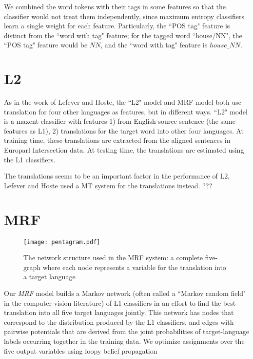 \documentclass[11pt,letterpaper]{article}
\begin{document}
We combined the word tokens with their tags in some features so that the
classifier would not treat them independently, since maximum entropy
classifiers learn a single weight for each feature.
Particularly, the ``POS tag" feature is distinct from the ``word with tag"
feature; for the tagged word ``house/NN", the ``POS tag" feature would be $NN$, and
the ``word with tag" feature is $house\_NN$. 


\section{L2}
As in the work of Lefever and Hoste, the ``L2" model and MRF model both use
translation for four other languages as features, but in different ways.  ``L2"
model is a maxent classifier with features 1) from English source sentence (the
same features as L1), 2) translations for the target word into other four
languages.  At training time, these translations are extracted from the aligned
sentences in Europarl Intersection data.  At testing time, the translations are
estimated using the L1 classifiers. 

The translations seems to be an important factor in the performance of L2,
Lefever and Hoste used a MT system for the translations instead.
???


\section{MRF}
\begin{figure}
  \begin{center}
  \texttt{[image: pentagram.pdf]}
  \end{center}
  \label{fig:pentagram}
  \caption{The network structure used in the MRF system: a complete five-graph
  where each node represents a variable for the translation into a target
language}
\end{figure}

Our \emph{MRF} model builds a Markov network (often called a ``Markov random
field" in the computer vision literature) of L1 classifiers in an effort to
find the best translation into all five target languages jointly. This network
has nodes that correspond to the distribution produced by the L1 classifiers,
and edges with pairwise potentials that are derived from the joint
probabilities of target-language labels occurring together in the training
data. We optimize assignments over the five output variables using loopy belief
propagation \cite{DBLP:conf/uai/MurphyWJ99}
\end{document}
